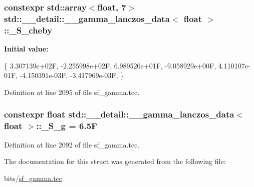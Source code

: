 \subsubsection[{\texorpdfstring{\+\_\+\+S\+\_\+cheby}{_S_cheby}}]{\setlength{\rightskip}{0pt plus 5cm}constexpr std\+::array$<$float, 7$>$ {\bf std\+::\+\_\+\+\_\+detail\+::\+\_\+\+\_\+gamma\+\_\+lanczos\+\_\+data}$<$ float $>$\+::\+\_\+\+S\+\_\+cheby\hspace{0.3cm}{\ttfamily [static]}}\hypertarget{structstd_1_1____detail_1_1____gamma__lanczos__data_3_01float_01_4_a2c49be7a79e21754e583099068cc1c3a}{}\label{structstd_1_1____detail_1_1____gamma__lanczos__data_3_01float_01_4_a2c49be7a79e21754e583099068cc1c3a}
{\bfseries Initial value\+:}
\begin{DoxyCode}
\{
     3.307139e+02F,
    -2.255998e+02F,
     6.989520e+01F,
    -9.058929e+00F,
     4.110107e-01F,
    -4.150391e-03F,
    -3.417969e-03F,
      \}
\end{DoxyCode}


Definition at line 2095 of file sf\+\_\+gamma.\+tcc.

\subsubsection[{\texorpdfstring{\+\_\+\+S\+\_\+g}{_S_g}}]{\setlength{\rightskip}{0pt plus 5cm}constexpr float {\bf std\+::\+\_\+\+\_\+detail\+::\+\_\+\+\_\+gamma\+\_\+lanczos\+\_\+data}$<$ float $>$\+::\+\_\+\+S\+\_\+g = 6.\+5F\hspace{0.3cm}{\ttfamily [static]}}\hypertarget{structstd_1_1____detail_1_1____gamma__lanczos__data_3_01float_01_4_aadc6da66fb542d6b88ddf3a0aef6249c}{}\label{structstd_1_1____detail_1_1____gamma__lanczos__data_3_01float_01_4_aadc6da66fb542d6b88ddf3a0aef6249c}


Definition at line 2092 of file sf\+\_\+gamma.\+tcc.



The documentation for this struct was generated from the following file\+:\begin{DoxyCompactItemize}
\item 
bits/\hyperlink{sf__gamma_8tcc}{sf\+\_\+gamma.\+tcc}\end{DoxyCompactItemize}
